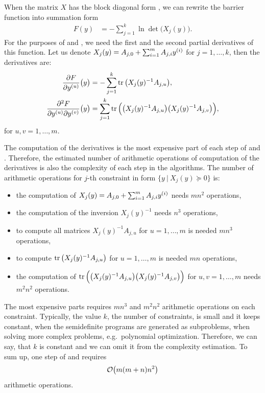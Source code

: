 When the matrix $X$ has the block diagonal form , we can rewrite the barrier function  into summation form
\begin{align}
  F(y) &= -\sum_{j=1}^k \ln\det\big(X_j(y)\big).
\end{align}
For the purposes of  and , we need the first and the second partial derivatives of this function.
Let us denote $X_j(y) = A_{j, 0} + \sum_{i=1}^mA_{j, i}y^{(i)}$ for $j = 1, \ldots, k$, then the derivatives are:
\begin{align}
  \frac{\partial F}{\partial y^{(u)}}\big(y\big) &= -\sum_{j=1}^k \operatorname{tr}\big(X_j(y)^{-1}A_{j,u}\big),\\
  \frac{\partial^2 F}{\partial y^{(u)} \partial y^{(v)}}\big(y\big) &= \sum_{j=1}^k \operatorname{tr}\Big(\big(X_j(y)^{-1}A_{j,u}\big)\big(X_j(y)^{-1}A_{j,v}\big)\Big),
\end{align}
for $u, v = 1,\ldots, m$.

The computation of the derivatives is the most expensive part of each step of  and .
Therefore, the estimated number of arithmetic operations of computation of the derivatives is also the complexity of each step in the algorithms.
The number of arithmetic operations for $j$-th constraint in form $\big\{y\ |\ X_j(y) \succeq 0\big\}$ is:
\begin{itemize}
  \item the computation of $X_j(y) = A_{j,0} + \sum_{i=1}^mA_{j,i}y^{(i)}$ needs $mn^2$ operations,
  \item the computation of the inversion $X_j(y)^{-1}$ needs $n^3$ operations,
  \item to compute all matrices $X_j(y)^{-1}A_{j,u}$ for $u = 1,\ldots,m$ is needed $mn^3$ operations,
  \item to compute $\operatorname{tr}\big(X_j(y)^{-1}A_{j,u}\big)$ for $u = 1,\ldots,m$ is needed $mn$ operations,
  \item the computation of $\operatorname{tr}\Big(\big(X_j(y)^{-1}A_{j,u}\big)\big(X_j(y)^{-1}A_{j,v}\big)\Big)$ for $u, v = 1,\ldots, m$ needs $m^2n^2$ operations.
\end{itemize}
The most expensive parts requires $mn^3$ and $m^2n^2$ arithmetic operations on each constraint.
Typically, the value $k$, the number of constraints, is small and it keeps constant, when the semidefinite programs are generated as subproblems, when solving more complex problems, e.g.\ polynomial optimization. Therefore, we can say, that $k$ is constant and we can omit it from the complexity estimation.
To sum up, one step of  and  requires
\begin{align}
  \mathcal{O}\big(m(m+n)n^2\big)\labeleq{SDP:bf:O}
\end{align}
arithmetic operations.

